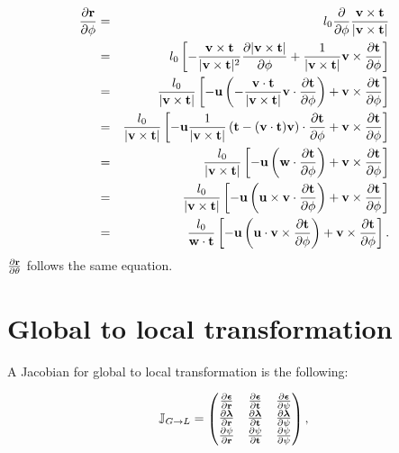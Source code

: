 \documentclass[12pt,a4paper]{scrarticle}
\begin{document}
\begin{eqnarray}\label{eq:drdphi}
    \frac{\partial{\mathbf{r}}}{\partial \phi} & = &  l_0 \frac{\partial}{\partial \phi} \frac{\mathbf{v} \times \mathbf{t}}{|\mathbf{v} \times \mathbf{t}|} \nonumber \\
    & = & l_0 \left[ - \frac{\mathbf{v} \times \mathbf{t}}{|\mathbf{v} \times \mathbf{t}|^2} \frac{\partial |\mathbf{v} \times \mathbf{t}|}{\partial \phi} + \frac{1}{|\mathbf{v} \times \mathbf{t}|} \mathbf{v} \times \frac{\partial \mathbf{t}}{\partial \phi} \right] \nonumber \\
    & = & \frac{l_0}{|\mathbf{v} \times \mathbf{t}|}\left[ -\mathbf{u} \left( -\frac{\mathbf{v} \cdot \mathbf{t}}{|\mathbf{v} \times \mathbf{t}|} \mathbf{v} \cdot \frac{\partial \mathbf{t}}{\partial \phi} \right)  + \mathbf{v} \times \frac{\partial \mathbf{t}}{\partial \phi}  \right] \nonumber \\
    & = & \frac{l_0}{|\mathbf{v} \times \mathbf{t}|}\left[ -\mathbf{u} \frac{1}{|\mathbf{v} \times \mathbf{t}|} \left( \mathbf{t} - (\mathbf{v} \cdot \mathbf{t})\mathbf{v} \right) \cdot \frac{\partial \mathbf{t}}{\partial \phi} + \mathbf{v} \times \frac{\partial \mathbf{t}}{\partial \phi}  \right] \nonumber \\
    & = & \frac{l_0}{|\mathbf{v} \times \mathbf{t}|}\left[ -\mathbf{u} \left( \mathbf{w} \cdot \frac{\partial \mathbf{t}}{\partial \phi} \right)  + \mathbf{v} \times \frac{\partial \mathbf{t}}{\partial \phi}  \right] \nonumber \\
    & = & \frac{l_0}{|\mathbf{v} \times \mathbf{t}|}\left[ -\mathbf{u} \left( \mathbf{u} \times \mathbf{v} \cdot \frac{\partial \mathbf{t}}{\partial \phi} \right)  + \mathbf{v} \times \frac{\partial \mathbf{t}}{\partial \phi}  \right] \nonumber \\   
    & = & \frac{l_0}{\mathbf{w} \cdot \mathbf{t}}\left[ -\mathbf{u} \left( \mathbf{u} \cdot \mathbf{v} \times \frac{\partial \mathbf{t}}{\partial \phi} \right)  + \mathbf{v} \times \frac{\partial \mathbf{t}}{\partial \phi}  \right].    
\end{eqnarray}
$\frac{\partial \mathbf{r}}{\partial \theta}$ follows the same equation.

\section{Global to local transformation}

A Jacobian for global to local transformation is the following:

\begin{equation}\label{eq:jacobi3}
    \mathbb{J}_{G \rightarrow L} = 
    \begin{pmatrix}
     \frac{\partial{\boldsymbol{\epsilon}}}{\partial{\mathbf{r}}} & 
     \frac{\partial{\boldsymbol{\epsilon}}}{\partial{\mathbf{t}}}&  \frac{\partial{\boldsymbol{\epsilon}}}{\partial{\psi}} \\
     \frac{\partial{\boldsymbol{\lambda}}}{\partial{\mathbf{r}}} & 
     \frac{\partial{\boldsymbol{\lambda}}}{\partial{\mathbf{t}}}&  \frac{\partial{\boldsymbol{\lambda}}}{\partial{\psi}} \\
     \frac{\partial{\psi}}{\partial{\mathbf{r}}} & 
     \frac{\partial{\psi}}{\partial{\mathbf{t}}}&  \frac{\partial{\psi}}{\partial{\psi}}
    \end{pmatrix},
\end{equation}
\end{document}
